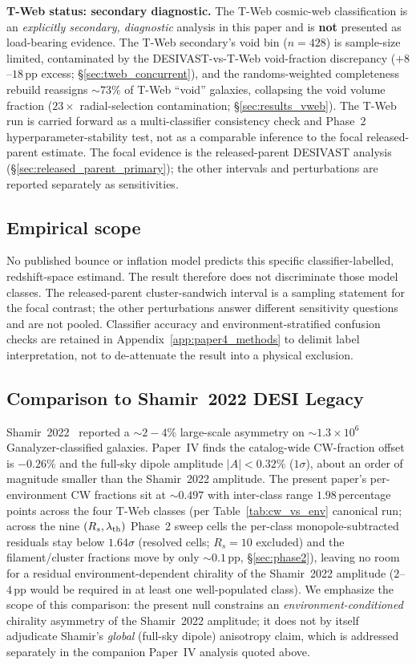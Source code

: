 \documentclass[aps,prd,twocolumn,superscriptaddress,showpacs,preprintnumbers,nofootinbib,longbibliography,floatfix]{revtex4-2}
\begin{document}
\textbf{T-Web status: secondary diagnostic.} The T-Web
cosmic-web classification is an \emph{explicitly secondary, diagnostic}
analysis in this paper and is \textbf{not} presented as load-bearing
evidence. The T-Web
secondary's void bin ($n=428$) is sample-size limited, contaminated by
the DESIVAST-vs-T-Web void-fraction discrepancy ($+8$--$18$\,pp excess;
\S\ref{sec:tweb_concurrent}), and the randoms-weighted completeness
rebuild reassigns ${\sim}73\%$ of T-Web ``void'' galaxies, collapsing
the void volume fraction ($23\times$ radial-selection contamination;
\S\ref{sec:results_vweb}). The T-Web run is carried forward as a
multi-classifier consistency check and Phase~2 hyperparameter-stability
test, not as a comparable inference to the focal released-parent estimate.
The focal evidence is the released-parent DESIVAST analysis
(\S\ref{sec:released_parent_primary}); the other intervals and
perturbations are reported separately as sensitivities.

\subsection{Empirical scope}

No published bounce or inflation model predicts this specific
classifier-labelled, redshift-space estimand. The result therefore does
not discriminate those model classes. The released-parent
cluster-sandwich interval is a sampling statement for the focal
contrast; the other perturbations answer different sensitivity
questions and are not pooled. Classifier accuracy and
environment-stratified confusion checks are retained in
Appendix~\ref{app:paper4_methods} to delimit label interpretation, not to
de-attenuate the result into a physical exclusion.

\subsection{Comparison to Shamir~2022 DESI Legacy}

Shamir~2022~\cite{Shamir2022DESI} reported a $\sim 2\!-\!4\%$
large-scale asymmetry on $\sim\!1.3\!\times\!10^6$ Ganalyzer-classified
galaxies. Paper~IV finds the catalog-wide CW-fraction offset is
$-0.26\%$ and the full-sky dipole amplitude $|A|\!<\!0.32\%$
($1\sigma$), about an order of magnitude smaller than the Shamir~2022
amplitude. The present paper's per-environment CW fractions sit at
$\sim 0.497$ with inter-class range $1.98$\,percentage points across the four
T-Web classes (per Table~\ref{tab:cw_vs_env} canonical run; across
the nine $(R_s, \lambda_{\rm th})$ Phase~2
sweep cells the per-class monopole-subtracted residuals stay below
$1.64\sigma$ (resolved cells; $R_s\!=\!10$ excluded) and the filament/cluster fractions move by
only ${\sim}0.1$\,pp, \S\ref{sec:phase2}), leaving no room
for a residual environment-dependent chirality of the Shamir~2022
amplitude ($2$--$4$\,pp would be required in at least one well-populated
class). We emphasize the scope of this comparison: the present null
constrains an \emph{environment-conditioned} chirality asymmetry of
the Shamir~2022 amplitude; it does not by itself adjudicate
Shamir's \emph{global} (full-sky dipole) anisotropy claim, which is
addressed separately in the companion Paper~IV analysis quoted above.
\end{document}
